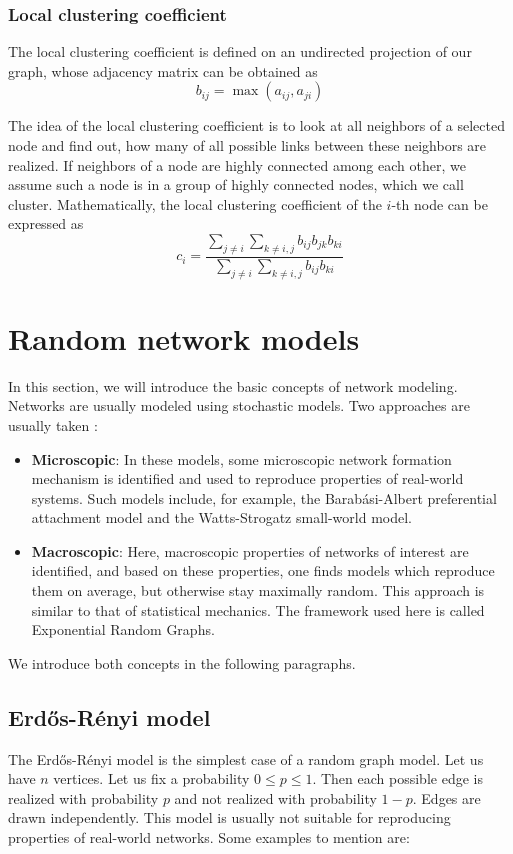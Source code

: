\subsubsection{Local clustering coefficient}
The local clustering coefficient is defined on an undirected projection of our graph, whose adjacency matrix can be obtained as
\begin{equation}
b_{ij} = \max(a_{ij}, a_{ji})
\end{equation}

The idea of the local clustering coefficient is to look at all neighbors of a selected node and find out, how many of all possible links between these neighbors are realized. If neighbors of a node are highly connected among each other, we assume such a node is in a group of highly connected nodes, which we call cluster. Mathematically, the local clustering coefficient of the $i$-th node can be expressed as
\begin{equation}
c_i = \frac{\sum_{j\neq i}\sum_{k\neq i,j}b_{ij} b_{jk} b_{ki}}{\sum_{j\neq i}\sum_{k\neq i,j}b_{ij}b_{ki}}
\end{equation}


\section{Random network models}
In this section, we will introduce the basic concepts of network modeling. Networks are usually modeled using stochastic models. Two approaches are usually taken \cite{Cimini2019}:
\begin{itemize}
    \item \textbf{Microscopic}: In these models, some microscopic network formation mechanism is identified and used to reproduce properties of real-world systems. Such models include, for example, the Barabási-Albert preferential attachment model and the Watts-Strogatz small-world model.
    \item \textbf{Macroscopic}: Here, macroscopic properties of networks of interest are identified, and based on these properties, one finds models which reproduce them on average, but otherwise stay maximally random. This approach is similar to that of statistical mechanics. The framework used here is called Exponential Random Graphs.
\end{itemize}
We introduce both concepts in the following paragraphs.
\subsection{Erdős-Rényi model}
The Erdős-Rényi model is the simplest case of a random graph model. Let us have $n$ vertices. Let us fix a probability $0 \leq p \leq 1$. Then each possible edge is realized with probability $p$ and not realized with probability $1-p$. Edges are drawn independently.
This model is usually not suitable for reproducing properties of real-world networks. Some examples to mention are:

